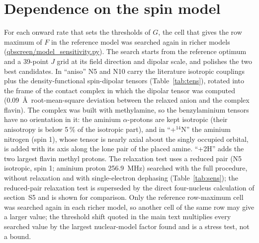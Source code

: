 \documentclass[11pt]{article}
\begin{document}
\begin{table}[h]
\caption{$F(k_S,k_P)$ (\%). Rates in $\mu$s$^{-1}$.}
\label{tab:map}
\centering
\resizebox{\textwidth}{!}{}
\end{table}

\section{Dependence on the spin model}
For each onward rate that sets the thresholds of $G$, the cell that gives the
row maximum of $F$ in the reference model was searched again in richer models
(\url{qbscreen/model_sensitivity.py}). The search starts from the reference
optimum and a 39-point $J$ grid at its field direction and dipolar scale, and
polishes the two best candidates. In ``aniso'' N5 and N10 carry the
literature isotropic couplings plus the density-functional spin-dipolar tensors
(Table~\ref{tab:tens}), rotated into the frame of the contact complex in
which the dipolar tensor was computed (0.09~\AA\ root-mean-square deviation
between the relaxed anion and the complex flavin). The complex was built with
methylamine, so the benzylaminium tensors have no orientation in it: the
aminium $\alpha$-protons are kept isotropic (their anisotropy is below 5\,\% of
the isotropic part), and in ``+$^{14}$N'' the aminium nitrogen (spin 1), whose
tensor is nearly axial about the singly occupied orbital, is added with its
axis along the lone pair of the placed amine. ``+2H'' adds the two largest
flavin methyl protons. The relaxation test uses a
reduced pair (N5 isotropic, spin 1; aminium proton 256.9~MHz) searched with the
full procedure, without relaxation and with single-electron dephasing
(Table~\ref{tab:sens}); the reduced-pair relaxation test is superseded by the
direct four-nucleus calculation of section~S5 and is shown for comparison. Only
the reference row-maximum cell was searched again in each richer model, so another cell of the same row may give a larger value;
the threshold shift quoted in the main text multiplies every searched value by
the largest nuclear-model factor found and is a stress test, not a bound.

\begin{table}[h]
\caption{Searched $F$ (\%) at the threshold-setting cells in the reference and
richer models, and in the reduced pair with and without electron dephasing.}
\label{tab:sens}
\centering

\end{table}
\end{document}

